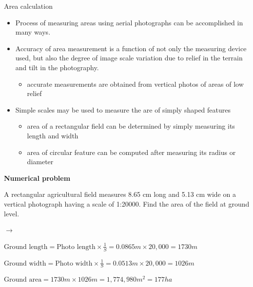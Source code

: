 \documentclass[10pt,dvipsnames,ignorenonframetext,aspectratio=169]{beamer}
\providecommand{\tightlist}{%
  \setlength{\itemsep}{0pt}\setlength{\parskip}{0pt}}
\begin{document}
\begin{frame}{Area calculation}
\protect\hypertarget{area-calculation}{}
\begin{itemize}
\tightlist
\item
  Process of measuring areas using aerial photographs can be
  accomplished in many ways.
\item
  Accuracy of area measurement is a function of not only the measuring
  device used, but also the degree of image scale variation due to
  relief in the terrain and tilt in the photography.

  \begin{itemize}
  \tightlist
  \item
    accurate measurements are obtained from vertical photos of areas of
    low relief
  \end{itemize}
\item
  Simple scales may be used to measure the are of simply shaped features

  \begin{itemize}
  \tightlist
  \item
    area of a rectangular field can be determined by simply measuring
    its length and width
  \item
    area of circular feature can be computed after measuring its radius
    or diameter
  \end{itemize}
\end{itemize}
\end{frame}

\begin{frame}{}
\protect\hypertarget{section-7}{}
\textbf{Numerical problem}

A rectangular agricultural field measures 8.65 cm long and 5.13 cm wide
on a vertical photograph having a scale of 1:20000. Find the area of the
field at ground level.

\(\longrightarrow\)

\(\text{Ground length} = \text{Photo length} \times \frac{1}{S} = 0.0865 m \times 20,000 = 1730 m\)

\(\text{Ground width} = \text{Photo width} \times \frac{1}{S} = 0.0513 m \times 20,000 = 1026 m\)

\(\text{Ground area} = 1730m \times 1026m = 1,774,980m^2 = 177 ha\)
\end{frame}
\end{document}
